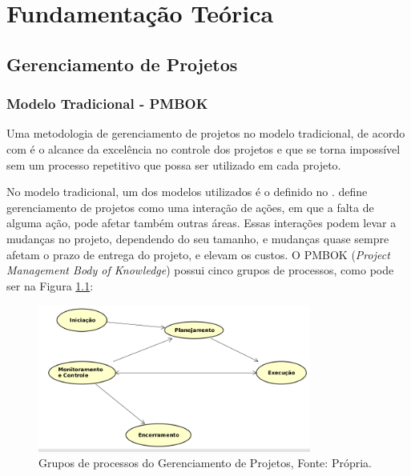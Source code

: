 \chapter[Fundamentação Teórica]{Fundamentação Teórica}
\label{cp:fundamentacao}

\section{Gerenciamento de Projetos}
\label{sec:gerenciamento_de_projetos}

\subsection{Modelo Tradicional - PMBOK}
\label{sec:modelo_tradicional}

Uma metodologia de gerenciamento de projetos no modelo tradicional, de acordo com  é o alcance da excelência no controle dos projetos e que se torna impossível sem um processo repetitivo que possa ser utilizado em cada projeto.

No modelo tradicional, um dos modelos utilizados é o definido no .  define gerenciamento de projetos como uma interação de ações, em que a falta de alguma ação, pode afetar também outras áreas. Essas interações podem levar a mudanças no projeto, dependendo do seu tamanho, e mudanças quase sempre afetam o prazo de entrega do projeto, e elevam os custos. O PMBOK (\textit{Project Management Body of Knowledge}) possui cinco grupos de processos, como pode ser na Figura \ref{img:fases_pmbok}:

\begin{figure}[H]
	\centering
	\includegraphics[width=0.8\textwidth]{figuras/fases_pmbok.png}
	\caption{Grupos de processos do Gerenciamento de Projetos, Fonte: Própria.}
	\label{img:fases_pmbok}
\end{figure}

